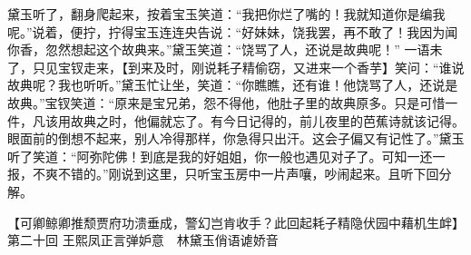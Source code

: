 \documentclass[12pt,oneside]{book}
\begin{document}
黛玉听了，翻身爬起来，按着宝玉笑道：“我把你烂了嘴的！我就知道你是编我呢。”说着，便拧，拧得宝玉连连央告说：“好妹妹，饶我罢，再不敢了！我因为闻你香，忽然想起这个故典来。”黛玉笑道：“饶骂了人，还说是故典呢！”
一语未了，只见宝钗走来，【到来及时，刚说耗子精偷窃，又进来一个香芋】笑问：“谁说故典呢？我也听听。”黛玉忙让坐，笑道：“你瞧瞧，还有谁！他饶骂了人，还说是故典。”宝钗笑道：“原来是宝兄弟，怨不得他，他肚子里的故典原多。只是可惜一件，凡该用故典之时，他偏就忘了。有今日记得的，前儿夜里的芭蕉诗就该记得。眼面前的倒想不起来，别人冷得那样，你急得只出汗。这会子偏又有记性了。”黛玉听了笑道：“阿弥陀佛！到底是我的好姐姐，你一般也遇见对子了。可知一还一报，不爽不错的。”刚说到这里，只听宝玉房中一片声嚷，吵闹起来。且听下回分解。



 
【可卿鲸卿推颓贾府功溃垂成，警幻岂肯收手？此回起耗子精隐伏园中藉机生衅】
第二十回  王熙凤正言弹妒意　林黛玉俏语谑娇音
\end{document}
